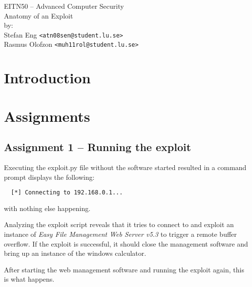 \documentclass[10pt]{article}
\begin{document}

  \thispagestyle{empty}
  \vspace*{3cm}
  \begin{center}
    \huge{EITN50 -- Advanced Computer Security} \\
    \vspace{0.3cm}
    \LARGE{Anatomy of an Exploit} \\
    \vspace{1cm}
    \large{by: \\ \vspace{0.2cm}
        Stefan Eng \texttt{<atn08sen@student.lu.se>} \\
        Rasmus Olofzon \texttt{<muh11rol@student.lu.se>}
        } \\
  \end{center}


  \newpage

  \section*{Introduction}

  \section{Assignments}

    \subsection{Assignment 1 -- Running the exploit}

      Executing the exploit.py file without the software started resulted in a
      command prompt displays the following:
      \begin{verbatim}
  [*] Connecting to 192.168.0.1...
      \end{verbatim}
      with nothing else happening.

      Analyzing the exploit script reveals that it tries to connect to and
      exploit an instance of \textit{Easy File Management Web Server v5.3} to trigger a
      remote buffer overflow. If the exploit is successful, it should close the
      management software and bring up an instance of the windows calculator.

      After starting the web management software and running the exploit again,
      this is what happens.
\end{document}
